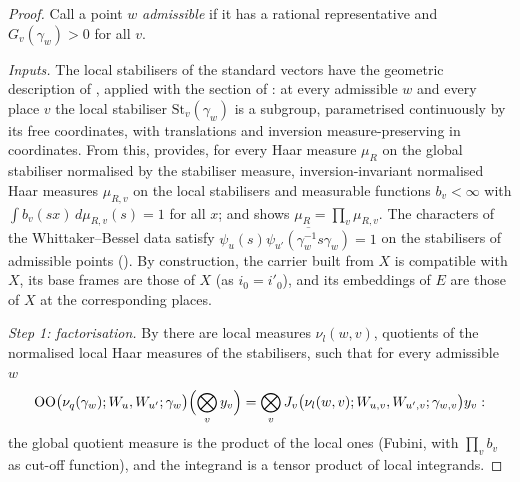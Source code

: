 \begin{proof}
Call a point $w$ \emph{admissible} if it has a rational representative and $G_v(\gamma_w)>0$ for all $v$.

\emph{Inputs.} The local stabilisers of the standard vectors have the geometric description of
, applied with the section of
: at every admissible $w$ and every place $v$ the local stabiliser
$\mathrm{St}_v(\gamma_w)$ is a subgroup, parametrised continuously by its free coordinates, with translations and inversion
measure-preserving in coordinates. From this,  provides, for every Haar
measure $\mu_R$ on the global stabiliser normalised by the stabiliser measure, inversion-invariant normalised Haar measures
$\mu_{R,v}$ on the local stabilisers and measurable functions $b_v<\infty$ with $\int b_v(sx)\,d\mu_{R,v}(s)=1$ for all $x$; and
 shows $\mu_R=\prod_v\mu_{R,v}$. The characters of the Whittaker--Bessel
data satisfy $\psi_u(s)\overline{\psi_{u'}(\gamma_w^{-1}s\gamma_w)}=1$ on the stabilisers of admissible points
(). By construction, the carrier built from $X$ is compatible with
$X$, its base frames are those of $X$ (as $i_0=i'_0$), and its embeddings of $E$ are those of $X$ at the corresponding places.

\emph{Step 1: factorisation.} By  there are local measures
$\nu_l(w,v)$, quotients of the normalised local Haar measures of the stabilisers, such that for every admissible $w$
\[
\mathrm{OO}\bigl(\nu_q(\gamma_w);W_u,W_{u'};\gamma_w\bigr)\Bigl(\bigotimes_vy_v\Bigr)=\bigotimes_vJ_v\bigl(\nu_l(w,v);W_{u,v},W_{u',v};
\gamma_{w,v}\bigr)y_v :
\]
the global quotient measure is the product of the local ones (Fubini, with $\prod_vb_v$ as cut-off function), and the integrand
is a tensor product of local integrands.


\end{proof}
